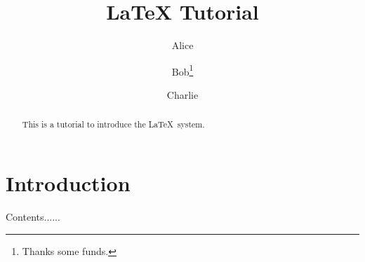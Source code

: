 \documentclass{article}
\title{LaTeX Tutorial}
\author{Alice \and Bob\thanks{Thanks some funds.} \and Charlie}
\begin{document}
\maketitle

\begin{abstract}
This is a tutorial to introduce the \LaTeX\ system.
\end{abstract}

\section{Introduction}
Contents......
\end{document}
